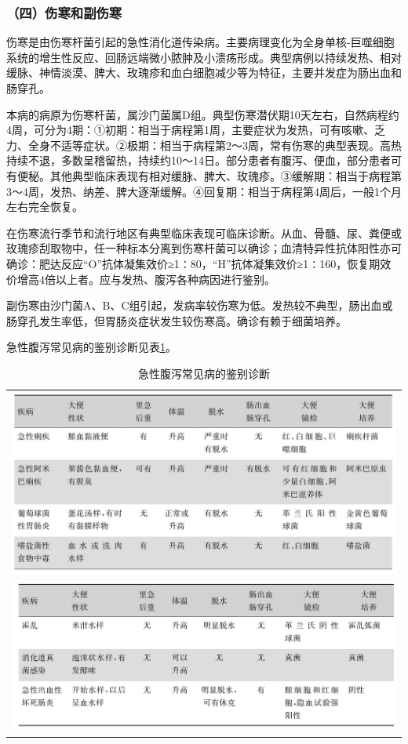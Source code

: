 \subsubsection{（四）伤寒和副伤寒}

伤寒是由伤寒杆菌引起的急性消化道传染病。主要病理变化为全身单核-巨噬细胞系统的增生性反应、回肠远端微小脓肿及小溃疡形成。典型病例以持续发热、相对缓脉、神情淡漠、脾大、玫瑰疹和血白细胞减少等为特征，主要并发症为肠出血和肠穿孔。

本病的病原为伤寒杆菌，属沙门菌属D组。典型伤寒潜伏期10天左右，自然病程约4周，可分为4期：①初期：相当于病程第1周，主要症状为发热，可有咳嗽、乏力、全身不适等症状。②极期：相当于病程第2～3周，常有伤寒的典型表现。高热持续不退，多数呈稽留热，持续约10～14日。部分患者有腹泻、便血，部分患者可有便秘。其他典型临床表现有相对缓脉、脾大、玫瑰疹。③缓解期：相当于病程第3～4周，发热、纳差、脾大逐渐缓解。④回复期：相当于病程第4周后，一般1个月左右完全恢复。

在伤寒流行季节和流行地区有典型临床表现可临床诊断。从血、骨髓、尿、粪便或玫瑰疹刮取物中，任一种标本分离到伤寒杆菌可以确诊；血清特异性抗体阳性亦可确诊：肥达反应“O”抗体凝集效价≥1∶80，“H”抗体凝集效价≥1∶160，恢复期效价增高4倍以上者。应与发热、腹泻各种病因进行鉴别。

副伤寒由沙门菌A、B、C组引起，发病率较伤寒为低。发热较不典型，肠出血或肠穿孔发生率低，但胃肠炎症状发生较伤寒高。确诊有赖于细菌培养。

急性腹泻常见病的鉴别诊断见表\ref{tab23-6}。

\begin{longtable}{c}
 \caption{急性腹泻常见病的鉴别诊断}
 \label{tab23-6}
 \endfirsthead
 \caption[]{急性腹泻常见病的鉴别诊断}
 \endhead
 \includegraphics[width=\textwidth,height=\textheight,keepaspectratio]{./images/Image00131.jpg}\\
 \includegraphics[width=\textwidth,height=\textheight,keepaspectratio]{./images/Image00132.jpg}
 \end{longtable}

